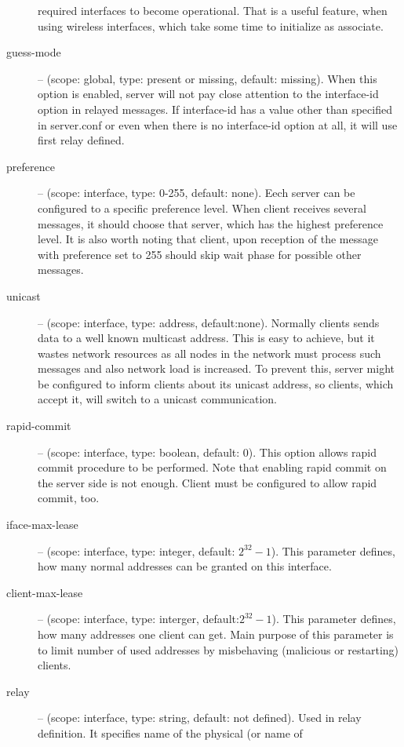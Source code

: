 \begin{description}
  required interfaces to become operational. That is a useful feature,
  when using wireless interfaces, which take some time to initialize
  as associate.
\item[guess-mode] -- (scope: global, type: present or missing,
  default: missing). When this option is enabled, server will not pay
  close attention to the interface-id option in relayed messages. If
  interface-id has a value other than specified in server.conf or even
  when there is no interface-id option at all, it will use first relay
  defined.
 \item[preference] -- (scope: interface, type: 0-255, default:
	    none). Eech server can be configured to a specific
	    preference level. When client receives several
	     messages, it should choose that server,
	    which has the highest preference level. It is also worth
	    noting that client, upon reception of the 
	    message with preference set to 255 should skip wait phase
	    for possible other  messages.
 \item[unicast] -- (scope: interface, type: address,
	    default:none). Normally clients sends data to a well known
	    multicast address. This is easy to achieve, but it wastes
	    network resources as all nodes in the network must process
	    such messages and also network load is increased. To prevent
	    this, server might be configured to inform clients about its
	    unicast address, so clients, which accept it, will switch to
	    a unicast communication.
 \item[rapid-commit] -- (scope: interface, type: boolean, default:
	    0). This option allows rapid commit procedure to be
	    performed. Note that enabling rapid commit on the server
	    side is not enough. Client must be configured to allow
	    rapid commit, too.
\item[iface-max-lease] -- (scope: interface, type: integer, default:
	    $2^{32}-1$). This parameter defines, how many normal
	    addresses can be granted on this interface.
\item[client-max-lease] -- (scope: interface, type: interger,
	    default:$2^{32}-1$). This parameter defines, how many
	    addresses one client can get. Main purpose of this
	    parameter is to limit number of used addresses by
	    misbehaving (malicious or restarting) clients.
\item[relay] -- (scope: interface, type: string, default: not
	    defined). Used in relay definition.
	    It specifies name of the physical (or name of

\end{description}
